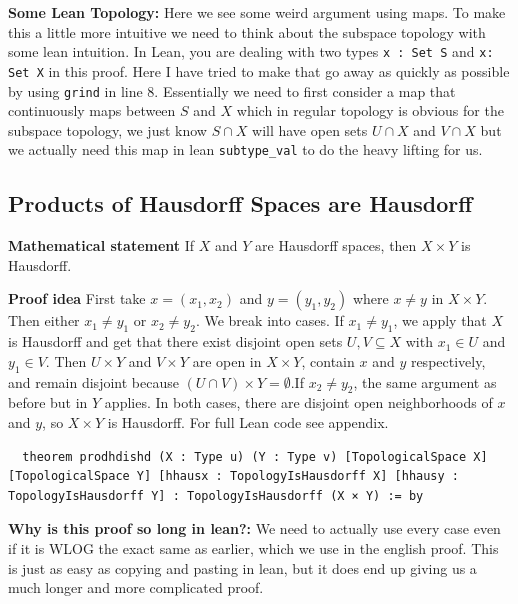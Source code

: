 \documentclass[11pt]{article}
\begin{document}
\medskip
\noindent
\textbf{Some Lean Topology:} Here we see some weird argument using maps. To make this a little more intuitive we need to think about the subspace topology with some lean intuition. In Lean, you are dealing with two types \verb|x : Set S| and \verb|x: Set X| in this proof. Here I have tried to make that go away as quickly as possible by using \verb|grind| in line 8. Essentially we need to first consider a map that continuously maps between $S$ and $X$ which in regular topology is obvious for the subspace topology, we just know $S \cap X$ will have open sets $U \cap X$ and $V \cap X$ but we actually need this map in lean \verb|subtype_val| to do the heavy lifting for us. 

\subsection{Products of Hausdorff Spaces are Hausdorff}

\textbf{Mathematical statement} 
If $X$ and $Y$ are Hausdorff spaces, then $X\times Y$ is Hausdorff.

\textbf{Proof idea} 
First take $x = (x_1,x_2)$ and $y = (y_1,y_2)$ where $x \not = y$ in $X \times Y$. Then either $x_1 \neq y_1$ or $x_2 \neq y_2$. We break into cases. If $x_1 \neq y_1$, we apply that $X$ is Hausdorff and get that there exist disjoint open sets $U,V \subseteq X$ with $x_1 \in U$ and $y_1 \in V$. Then $U \times Y$ and $V \times Y$ are open in $X \times Y$, contain $x$ and $y$ respectively, and remain disjoint because $(U \cap V) \times Y = \emptyset$.If $x_2 \neq y_2$, the same argument as before but in $Y$ applies. In both cases, there are disjoint open neighborhoods of $x$ and $y$, so $X \times Y$ is Hausdorff. For full Lean code see appendix.

\begin{verbatim}
  theorem prodhdishd (X : Type u) (Y : Type v) [TopologicalSpace X] [TopologicalSpace Y] [hhausx : TopologyIsHausdorff X] [hhausy : TopologyIsHausdorff Y] : TopologyIsHausdorff (X × Y) := by
\end{verbatim}

\medskip
\noindent
\textbf{Why is this proof so long in lean?:} We need to actually use every case even if it is WLOG the exact same as earlier, which we use in the english proof. This is just as easy as copying and pasting in lean, but it does end up giving us a much longer and more complicated proof. 
\end{document}
